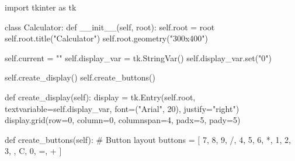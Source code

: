 \documentclass[
  letterpaper,
  DIV=11,
  numbers=noendperiod,
  oneside]{scrreprt}
\newenvironment{Shaded}{}{}
\newcommand{\BuiltInTok}[1]{\textcolor[rgb]{0.84,0.23,0.29}{#1}}
\newcommand{\CommentTok}[1]{\textcolor[rgb]{0.42,0.45,0.49}{#1}}
\newcommand{\DecValTok}[1]{\textcolor[rgb]{0.00,0.36,0.77}{#1}}
\newcommand{\FunctionTok}[1]{\textcolor[rgb]{0.44,0.26,0.76}{#1}}
\newcommand{\ImportTok}[1]{\textcolor[rgb]{0.01,0.18,0.38}{#1}}
\newcommand{\KeywordTok}[1]{\textcolor[rgb]{0.84,0.23,0.29}{#1}}
\newcommand{\NormalTok}[1]{\textcolor[rgb]{0.14,0.16,0.18}{#1}}
\newcommand{\OperatorTok}[1]{\textcolor[rgb]{0.14,0.16,0.18}{#1}}
\newcommand{\StringTok}[1]{\textcolor[rgb]{0.01,0.18,0.38}{#1}}
\newcommand{\VariableTok}[1]{\textcolor[rgb]{0.89,0.38,0.04}{#1}}
\begin{document}
\begin{Shaded}
\begin{Highlighting}[]
\ImportTok{import}\NormalTok{ tkinter }\ImportTok{as}\NormalTok{ tk}

\KeywordTok{class}\NormalTok{ Calculator:}
    \KeywordTok{def} \FunctionTok{\_\_init\_\_}\NormalTok{(}\VariableTok{self}\NormalTok{, root):}
        \VariableTok{self}\NormalTok{.root }\OperatorTok{=}\NormalTok{ root}
        \VariableTok{self}\NormalTok{.root.title(}\StringTok{"Calculator"}\NormalTok{)}
        \VariableTok{self}\NormalTok{.root.geometry(}\StringTok{"300x400"}\NormalTok{)}
        
        \VariableTok{self}\NormalTok{.current }\OperatorTok{=} \StringTok{""}
        \VariableTok{self}\NormalTok{.display\_var }\OperatorTok{=}\NormalTok{ tk.StringVar()}
        \VariableTok{self}\NormalTok{.display\_var.}\BuiltInTok{set}\NormalTok{(}\StringTok{"0"}\NormalTok{)}
        
        \VariableTok{self}\NormalTok{.create\_display()}
        \VariableTok{self}\NormalTok{.create\_buttons()}
        
    \KeywordTok{def}\NormalTok{ create\_display(}\VariableTok{self}\NormalTok{):}
\NormalTok{        display }\OperatorTok{=}\NormalTok{ tk.Entry(}\VariableTok{self}\NormalTok{.root, textvariable}\OperatorTok{=}\VariableTok{self}\NormalTok{.display\_var,}
\NormalTok{                          font}\OperatorTok{=}\NormalTok{(}\StringTok{"Arial"}\NormalTok{, }\DecValTok{20}\NormalTok{), justify}\OperatorTok{=}\StringTok{"right"}\NormalTok{)}
\NormalTok{        display.grid(row}\OperatorTok{=}\DecValTok{0}\NormalTok{, column}\OperatorTok{=}\DecValTok{0}\NormalTok{, columnspan}\OperatorTok{=}\DecValTok{4}\NormalTok{, padx}\OperatorTok{=}\DecValTok{5}\NormalTok{, pady}\OperatorTok{=}\DecValTok{5}\NormalTok{)}
        
    \KeywordTok{def}\NormalTok{ create\_buttons(}\VariableTok{self}\NormalTok{):}
        \CommentTok{\# Button layout}
\NormalTok{        buttons }\OperatorTok{=}\NormalTok{ [}
            \StringTok{\textquotesingle{}7\textquotesingle{}}\NormalTok{, }\StringTok{\textquotesingle{}8\textquotesingle{}}\NormalTok{, }\StringTok{\textquotesingle{}9\textquotesingle{}}\NormalTok{, }\StringTok{\textquotesingle{}/\textquotesingle{}}\NormalTok{,}
            \StringTok{\textquotesingle{}4\textquotesingle{}}\NormalTok{, }\StringTok{\textquotesingle{}5\textquotesingle{}}\NormalTok{, }\StringTok{\textquotesingle{}6\textquotesingle{}}\NormalTok{, }\StringTok{\textquotesingle{}*\textquotesingle{}}\NormalTok{,}
            \StringTok{\textquotesingle{}1\textquotesingle{}}\NormalTok{, }\StringTok{\textquotesingle{}2\textquotesingle{}}\NormalTok{, }\StringTok{\textquotesingle{}3\textquotesingle{}}\NormalTok{, }\StringTok{\textquotesingle{}{-}\textquotesingle{}}\NormalTok{,}
            \StringTok{\textquotesingle{}C\textquotesingle{}}\NormalTok{, }\StringTok{\textquotesingle{}0\textquotesingle{}}\NormalTok{, }\StringTok{\textquotesingle{}=\textquotesingle{}}\NormalTok{, }\StringTok{\textquotesingle{}+\textquotesingle{}}
\NormalTok{        ]}
        

\end{Highlighting}
\end{Shaded}
\end{document}
